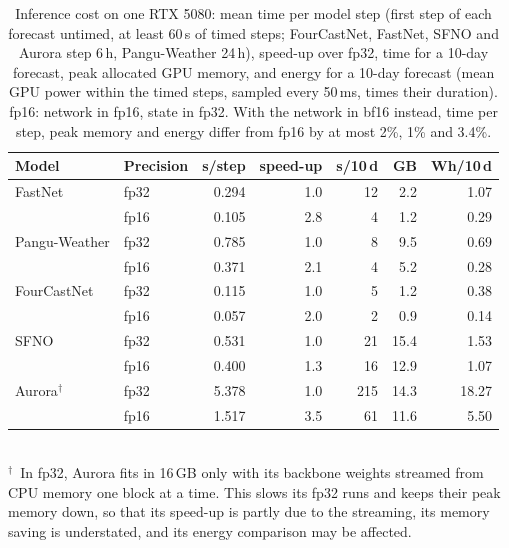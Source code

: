 \begin{table}[tbp]
\centering
\small
\caption{Inference cost on one RTX 5080: mean time per model step (first step of each forecast untimed, at least 60\,s of timed steps; FourCastNet, FastNet, SFNO and Aurora step 6\,h, Pangu-Weather 24\,h), speed-up over fp32, time for a 10-day forecast, peak allocated GPU memory, and energy for a 10-day forecast (mean GPU power within the timed steps, sampled every 50\,ms, times their duration). fp16: network in fp16, state in fp32. With the network in bf16 instead, time per step, peak memory and energy differ from fp16 by at most 2\%, 1\% and 3.4\%.}
\label{tab:benchmark}
\begin{tabular}{llrrrrr}
\toprule
Model & Precision & s/step & speed-up & s/10\,d & GB & Wh/10\,d \\
\midrule
FastNet & fp32 & 0.294 & 1.0 & 12 & 2.2 & 1.07 \\
 & fp16 & 0.105 & 2.8 & 4 & 1.2 & 0.29 \\
\midrule
Pangu-Weather & fp32 & 0.785 & 1.0 & 8 & 9.5 & 0.69 \\
 & fp16 & 0.371 & 2.1 & 4 & 5.2 & 0.28 \\
\midrule
FourCastNet & fp32 & 0.115 & 1.0 & 5 & 1.2 & 0.38 \\
 & fp16 & 0.057 & 2.0 & 2 & 0.9 & 0.14 \\
\midrule
SFNO & fp32 & 0.531 & 1.0 & 21 & 15.4 & 1.53 \\
 & fp16 & 0.400 & 1.3 & 16 & 12.9 & 1.07 \\
\midrule
Aurora$^\dagger$ & fp32 & 5.378 & 1.0 & 215 & 14.3 & 18.27 \\
 & fp16 & 1.517 & 3.5 & 61 & 11.6 & 5.50 \\
\bottomrule
\end{tabular}\\[2pt]
{\scriptsize $^\dagger$~In fp32, Aurora fits in 16\,GB only with its backbone weights streamed from CPU memory one block at a time. This slows its fp32 runs and keeps their peak memory down, so that its speed-up is partly due to the streaming, its memory saving is understated, and its energy comparison may be affected.}
\end{table}
